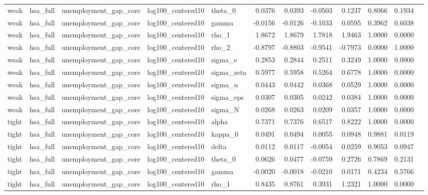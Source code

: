 \begin{tabular}{lllllrrrrrrl}
weak & hsa\_full & unemployment\_gap\_core & log100\_centered10 & theta\_0 & 0.0376 & 0.0393 & -0.0503 & 0.1237 & 0.8066 & 0.1934 &  \\
weak & hsa\_full & unemployment\_gap\_core & log100\_centered10 & gamma & -0.0156 & -0.0126 & -0.1033 & 0.0595 & 0.3962 & 0.6038 &  \\
weak & hsa\_full & unemployment\_gap\_core & log100\_centered10 & rho\_1 & 1.8672 & 1.8679 & 1.7818 & 1.9463 & 1.0000 & 0.0000 &  \\
weak & hsa\_full & unemployment\_gap\_core & log100\_centered10 & rho\_2 & -0.8797 & -0.8803 & -0.9541 & -0.7973 & 0.0000 & 1.0000 &  \\
weak & hsa\_full & unemployment\_gap\_core & log100\_centered10 & sigma\_e & 0.2853 & 0.2844 & 0.2511 & 0.3249 & 1.0000 & 0.0000 &  \\
weak & hsa\_full & unemployment\_gap\_core & log100\_centered10 & sigma\_zeta & 0.5977 & 0.5958 & 0.5264 & 0.6778 & 1.0000 & 0.0000 &  \\
weak & hsa\_full & unemployment\_gap\_core & log100\_centered10 & sigma\_u & 0.0443 & 0.0442 & 0.0368 & 0.0529 & 1.0000 & 0.0000 &  \\
weak & hsa\_full & unemployment\_gap\_core & log100\_centered10 & sigma\_eps & 0.0307 & 0.0305 & 0.0242 & 0.0384 & 1.0000 & 0.0000 &  \\
weak & hsa\_full & unemployment\_gap\_core & log100\_centered10 & sigma\_N & 0.0268 & 0.0263 & 0.0209 & 0.0357 & 1.0000 & 0.0000 &  \\
tight & hsa\_full & unemployment\_gap\_core & log100\_centered10 & alpha & 0.7371 & 0.7376 & 0.6517 & 0.8222 & 1.0000 & 0.0000 &  \\
tight & hsa\_full & unemployment\_gap\_core & log100\_centered10 & kappa\_0 & 0.0491 & 0.0494 & 0.0055 & 0.0948 & 0.9881 & 0.0119 &  \\
tight & hsa\_full & unemployment\_gap\_core & log100\_centered10 & delta & 0.0112 & 0.0117 & -0.0054 & 0.0259 & 0.9053 & 0.0947 &  \\
tight & hsa\_full & unemployment\_gap\_core & log100\_centered10 & theta\_0 & 0.0626 & 0.0477 & -0.0759 & 0.2726 & 0.7869 & 0.2131 &  \\
tight & hsa\_full & unemployment\_gap\_core & log100\_centered10 & gamma & -0.0020 & -0.0018 & -0.0210 & 0.0171 & 0.4234 & 0.5766 &  \\
tight & hsa\_full & unemployment\_gap\_core & log100\_centered10 & rho\_1 & 0.8435 & 0.8761 & 0.3931 & 1.2321 & 1.0000 & 0.0000 &  \\

\end{tabular}
